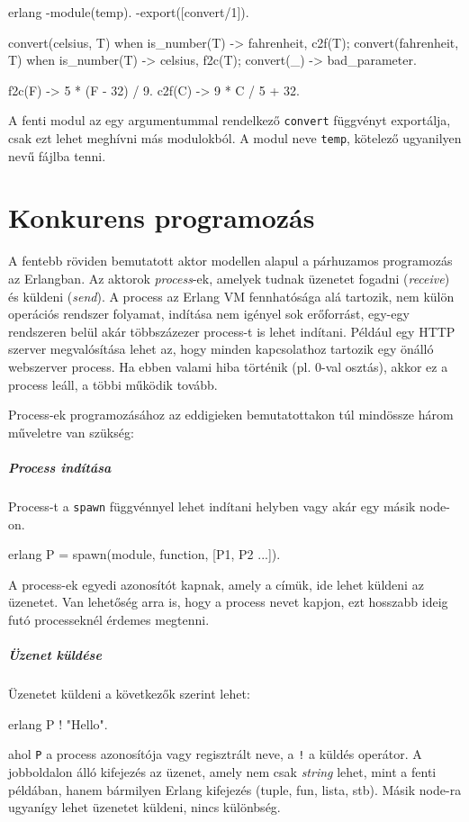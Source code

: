 \documentclass[12pt, a4paper, oneside]{book}
\begin{document}
\begin{code}{erlang}{}
-module(temp).
-export([convert/1]).

convert({celsius, T}) when is_number(T) ->
  {fahrenheit, c2f(T)};
convert({fahrenheit, T}) when is_number(T) ->
  {celsius, f2c(T)};
convert(_) ->
  bad_parameter.

f2c(F) ->
  5 * (F - 32) / 9.
c2f(C) ->
  9 * C / 5 + 32.
\end{code}

A fenti modul az egy argumentummal rendelkező \texttt{convert} függvényt
exportálja, csak ezt lehet meghívni más modulokból. A modul neve \texttt{temp},
kötelező ugyanilyen nevű fájlba tenni.

\section{Konkurens programozás}
A fentebb röviden bemutatott aktor modellen alapul a párhuzamos
programozás az Erlangban. Az aktorok \emph{process}-ek, amelyek tudnak üzenetet
fogadni (\emph{receive}) és küldeni (\emph{send}). A process az Erlang VM
fennhatósága alá tartozik, nem külön operációs rendszer folyamat, indítása nem
igényel sok erőforrást, egy-egy rendszeren belül akár többszázezer process-t
is lehet indítani. Például egy HTTP szerver megvalósítása lehet az, hogy minden
kapcsolathoz tartozik egy önálló webszerver process. Ha ebben valami hiba
történik (pl. 0-val osztás), akkor ez a process leáll, a többi működik tovább.

Process-ek programozásához az eddigieken bemutatottakon túl mindössze három
műveletre van szükség:

\subparagraph{Process indítása} Process-t a \texttt{spawn} függvénnyel lehet
indítani helyben vagy akár egy másik node-on.
\begin{code}{erlang}{}
 P = spawn(module, function, [P1, P2 ...]).
\end{code}

\noindent A process-ek egyedi azonosítót kapnak, amely a címük, ide lehet
küldeni az üzenetet. Van lehetőség arra is, hogy a process nevet kapjon, ezt
hosszabb ideig futó processeknél érdemes megtenni.

\subparagraph{Üzenet küldése} Üzenetet küldeni a következők szerint lehet:
\begin{code}{erlang}{}
          P ! "Hello". 
\end{code} 
\noindent ahol \texttt{P} a process azonosítója vagy regisztrált
neve, a \texttt{!} a küldés operátor. A jobboldalon álló kifejezés az üzenet,
amely nem csak \emph{string} lehet, mint a fenti példában, hanem bármilyen Erlang
kifejezés (tuple, fun, lista, stb). Másik node-ra ugyanígy lehet üzenetet
küldeni, nincs különbség.
\end{document}
